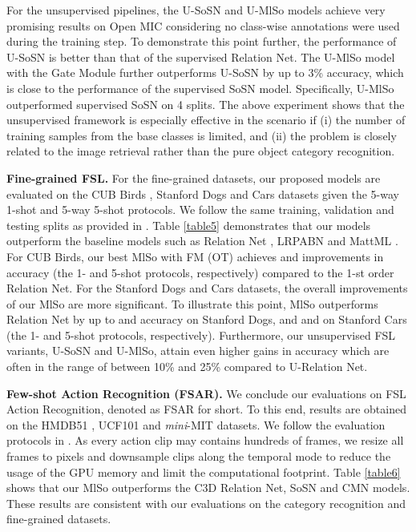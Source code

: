 For the unsupervised pipelines, the U-SoSN and U-MlSo models achieve very promising results on  Open MIC considering no class-wise annotations were used during the training step. To demonstrate this point further, the performance of U-SoSN is better than that of the supervised Relation Net. { The U-MlSo model with the Gate Module further outperforms U-SoSN by up to 3\% accuracy, which is close to the performance of the supervised SoSN model. Specifically, U-MlSo outperformed supervised SoSN on 4 splits.} The above experiment shows that the unsupervised framework is especially effective in the scenario if (i) the number of training samples from the base classes is limited, and (ii) the problem is closely related to the image retrieval rather than the pure object category recognition. 

\vspace{0.05cm}
\noindent\textbf{\hg Fine-grained FSL.}
{\hg For the fine-grained datasets, our proposed models are evaluated on the CUB Birds \cite{WahCUB_200_2011}, Stanford Dogs \cite{dogs} and Cars \cite{cars} datasets given the 5-way 1-shot and  5-way 5-shot protocols. We follow the same training, validation and testing splits as provided in \cite{huang2020low}. Table \ref{table5} demonstrates that our models outperform the baseline models such as Relation Net \cite{sung2017learning}, LRPABN \cite{huang2020low} and MattML \cite{zhu2020multi}. For CUB Birds, our best MlSo with FM (OT) achieves  and  improvements in accuracy (the 1- and 5-shot protocols, respectively) compared to the 1-st order Relation Net. 
For the Stanford Dogs and Cars datasets, the overall improvements of our MlSo are more significant. To illustrate this point, MlSo outperforms Relation Net by up to  and  accuracy on Stanford Dogs, and  and  on Stanford Cars (the 1- and 5-shot protocols, respectively). Furthermore, our unsupervised FSL variants, U-SoSN and U-MlSo, attain even higher gains in accuracy which are often in the range of between 10\% and 25\% compared to U-Relation Net.}


\vspace{0.05cm}
\noindent\textbf{\hg Few-shot Action Recognition (FSAR).}
{\hg We conclude our evaluations on FSL Action Recognition, denoted as FSAR for short. To this end, results are obtained on the HMDB51 \cite{Kuehne11}, UCF101 \cite{soomro2012ucf101} and \textit{mini}-MIT \cite{monfortmoments} datasets. We follow the  evaluation protocols in \cite{arn}. As every action clip may contains hundreds of frames, we resize all frames to  pixels and downsample clips along the temporal mode to reduce the usage of the GPU memory and limit the computational footprint. Table \ref{table6} shows that our MlSo outperforms the C3D Relation Net, SoSN and CMN \cite{cmn} models. These results are consistent with our evaluations on the category
recognition and fine-grained datasets.}


